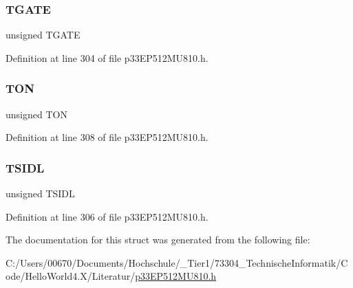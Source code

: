 \subsubsection{\texorpdfstring{T\+G\+A\+TE}{TGATE}}
{\footnotesize\ttfamily unsigned T\+G\+A\+TE}



Definition at line 304 of file p33\+E\+P512\+M\+U810.\+h.

\mbox{\label{structtag_t3_c_o_n_b_i_t_s_a8c2a094047d1019ce1c5b25ea8cff9b3}} 
\subsubsection{\texorpdfstring{T\+ON}{TON}}
{\footnotesize\ttfamily unsigned T\+ON}



Definition at line 308 of file p33\+E\+P512\+M\+U810.\+h.

\mbox{\label{structtag_t3_c_o_n_b_i_t_s_a4971b881615ef42703b5b78179fcda3d}} 
\subsubsection{\texorpdfstring{T\+S\+I\+DL}{TSIDL}}
{\footnotesize\ttfamily unsigned T\+S\+I\+DL}



Definition at line 306 of file p33\+E\+P512\+M\+U810.\+h.



The documentation for this struct was generated from the following file\+:\begin{DoxyCompactItemize}
\item 
C\+:/\+Users/00670/\+Documents/\+Hochschule/\+\_\+\+Tier1/73304\+\_\+\+Technische\+Informatik/\+Code/\+Hello\+World4.\+X/\+Literatur/\hyperlink{p33_e_p512_m_u810_8h}{p33\+E\+P512\+M\+U810.\+h}\end{DoxyCompactItemize}
